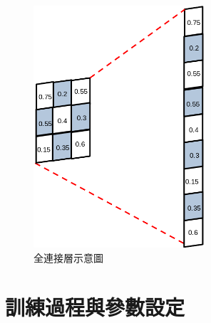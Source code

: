 \begin{figure}[H]
	\centering
	\includegraphics[height=9cm]{./pic/7oVj71cG.png}
	\caption{全連接層示意圖}
	\label{fig:FullyConnetedLayer}
\end{figure}

\section{訓練過程與參數設定}
